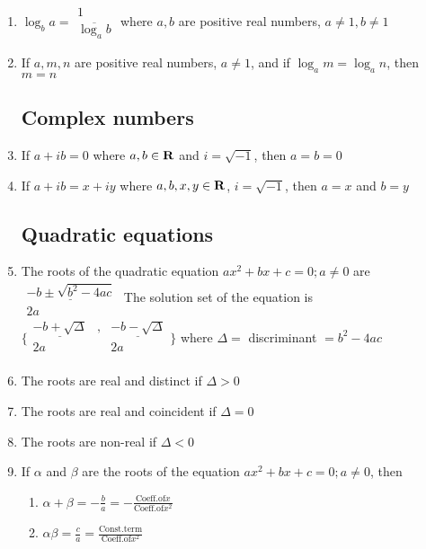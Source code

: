 \documentclass[a4paper]{article}
\begin{document}
\begin{enumerate}
\item
$\log_b a = 
\begin{array}{c} 1 \\ \overline{\log_a b} \end{array}
$ 
where $a,b$ are positive real numbers, $a \neq 1, b \neq 1$

\item
If $a,m,n$ are positive real numbers, $a \neq 1$, and if
$\log_a m = \log_a n$, then $m=n$

\subsection{Complex numbers}

\item
If $a+ib =0$ where $a,b \in \mathbf{R}$ and $i = \sqrt{-1}$,
then $a=b=0$

\item
If $a+ib=x+iy$ where $a,b,x,y \in \mathbf{R}$, $i = \sqrt{-1}$,
then $a=x$ and $b=y$

\subsection{Quadratic equations}

\item
The roots of the quadratic equation $ax^2 + bx+c=0; a \neq 0$
are 
$\begin{array}{c}
\underline{-b \pm \sqrt{b^2-4ac} } \\
2a
\end{array}$
The solution set of the equation is
$\Big\{ 
\begin{array}{ccc}
\underline{-b + \sqrt \Delta} &,& \underline{-b - \sqrt \Delta} \\
2a & & 2a \\
\end{array}
\Big\}$
where $\Delta =$ discriminant $=b^2-4ac$

\item
The roots are real and distinct if $\Delta > 0$

\item
The roots are real and coincident if $\Delta = 0$

\item
The roots are non-real if $\Delta < 0$

\item
If $\alpha$ and $\beta$ are the roots of the equation 
$ax^2 + bx+c=0; a \neq 0$,
then
\begin{enumerate}
\item
$\alpha +\beta = -\frac{b}{a} = - \frac{\mathrm{Coeff. of }x}{\mathrm{Coeff. of }x^2}$
\item
$\alpha \beta = \frac{c}{a} = \frac{\mathrm{Const. term}}{\mathrm{Coeff. of }x^2}$
\end{enumerate}


\end{enumerate}
\end{document}
